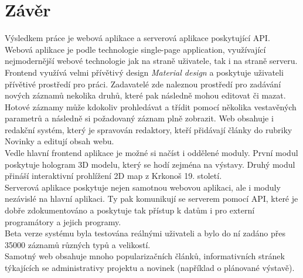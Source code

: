 \chapter*{Závěr}
\noindent
Výsledkem práce je webová aplikace a serverová aplikace poskytující API.
\\


Webová aplikace je podle technologie single-page application,
využívající nejmodernější webové technologie jak na straně uživatele, tak i na straně
serveru. Frontend využívá velmi přívětivý design \textit{Material design} a 
poskytuje uživateli přívětivé prostředí pro práci. Zadavatelé zde naleznou
prostředí pro zadávání nových záznamů nekolika druhů, které pak následně
mohou editovat či mazat. Hotové záznamy může kdokoliv prohledávat a
třídit pomocí několika vestavěných parametrů a následně si požadovaný záznam
plně zobrazit. Web obsahuje i redakční systém, který je spravován redaktory,
kteří přidávají články do rubriky Novinky a editují obsah webu.
\\


Vedle hlavní frontend aplikace je možné si načíst i oddělené moduly.
První modul poskytuje hologram 3D modelu, který se hodí zejména na výstavy.
Druhý modul přináší interaktivní prohlížení 2D map z Krkonoš 19. století.
\\


Serverová aplikace poskytuje nejen samotnou webovou aplikaci, ale i 
moduly nezávislé na hlavní aplikaci. Ty pak komunikují se serverem pomocí API,
které je dobře zdokumentováno a poskytuje tak přístup k datům i pro 
externí programátory a jejich programy.
\\


Beta verze systému byla testována reálnými uživateli a bylo do ní
zadáno přes 35000 záznamů různých typů a velikostí.
\\


Samotný web obsahuje mnoho popularizačních článků, informativních stránek týkajících
se administrativy projektu a novinek (například o plánované výstavě).


